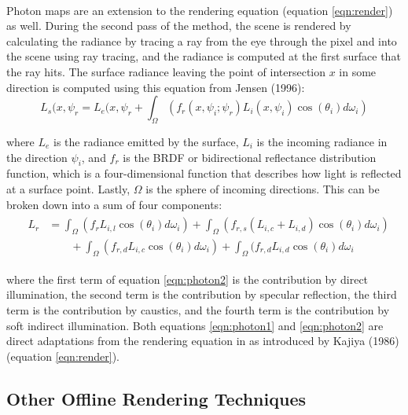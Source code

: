 \paragraph{}
Photon maps are an extension to the rendering equation (equation \ref{eqn:render}) as well.  During the second pass of the method, the scene is rendered by calculating the radiance by tracing a ray from the eye through the pixel and into the scene using ray tracing, and the radiance is computed at the first surface that the ray hits.  The surface radiance leaving the point of intersection $x$ in some direction is computed using this equation from Jensen (1996):
\begin{equation}
L_{s}(x,\psi_{r} = L_{e}(x,\psi_{r} + \int_{\Omega}(f_{r}(x,\psi_{i};\psi_{r})L_{i}(x,\psi_{i})\cos(\theta_{i})d\omega_{i}) \label{eqn:photon1}
\end{equation}

where $L_{e}$ is the radiance emitted by the surface, $L_{i}$ is the incoming radiance in the direction $\psi_{i}$, and $f_{r}$ is the BRDF or bidirectional reflectance distribution function, which is a four-dimensional function that describes how light is reflected at a surface point.  Lastly, $\Omega$ is the sphere of incoming directions.  This can be broken down into a sum of four components:
\begin{align}
  &\begin{aligned} \label{eqn:photon2}
    L_{r} &=  \int_{\Omega} (f_{r}L_{i,l}\cos(\theta_{i})d\omega_{i}) + \int_{\Omega}(f_{r,s}(L_{i,c}+L_{i,d})\cos(\theta_{i})d\omega_{i})\\
      &\qquad + \int_{\Omega} (f_{r,d}L_{i,c}\cos(\theta_{i})d\omega_{i}) +  \int_{\Omega}(f_{r,d}L_{i,d}\cos(\theta_{i})d\omega_{i}
  \end{aligned}
\end{align}

where the first term of equation \ref{eqn:photon2} is the contribution by direct illumination, the second term is the contribution by specular reflection, the third term is the contribution by caustics, and the fourth term is the contribution by soft indirect illumination.  Both equations \ref{eqn:photon1} and \ref{eqn:photon2} are direct adaptations from the rendering equation in as introduced by Kajiya (1986) (equation \ref{eqn:render}).

\subsection{Other Offline Rendering Techniques} \label{sec:otheroffline}
